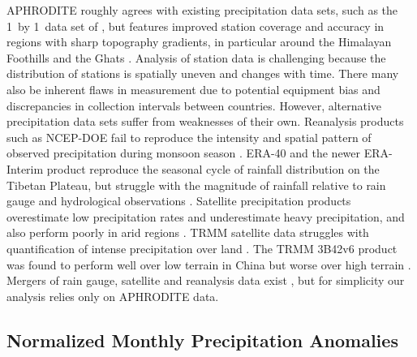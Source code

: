 	
	APHRODITE roughly agrees with existing precipitation data sets, such as the 1\textdegree\ by 1\textdegree\ data set of \cite{Rajeevan2006}, but features improved station coverage and accuracy in regions with sharp topography gradients, in particular around the Himalayan Foothills and the Ghats \citep{Yatagai2012}. Analysis of station data is challenging because the distribution of stations is spatially uneven and changes with time. There many also be inherent flaws in measurement due to potential equipment bias and discrepancies in collection intervals between countries. However, alternative precipitation data sets suffer from weaknesses of their own. Reanalysis products such as NCEP-DOE fail to reproduce the intensity and spatial pattern of observed precipitation during monsoon season \citep{Pena-Arancibia2013}. ERA-40 and the newer ERA-Interim product reproduce the seasonal cycle of rainfall distribution on the Tibetan Plateau, but struggle with the magnitude of rainfall relative to rain gauge and hydrological observations \citep{Tong2014}. Satellite precipitation products overestimate low precipitation rates and underestimate heavy precipitation, and also perform poorly in arid regions \citep{Gao2013a}. TRMM satellite data struggles with quantification of intense precipitation over land \citep{Iguchi2009}. The TRMM 3B42v6 product was found to perform well over low terrain in China but worse over high terrain \citep{Zhao2013}. Mergers of rain gauge, satellite and reanalysis data exist \citep{Pena-Arancibia2013,Shen2014}, but for simplicity our analysis relies only on APHRODITE data.
	
\subsection{Normalized Monthly Precipitation Anomalies}

